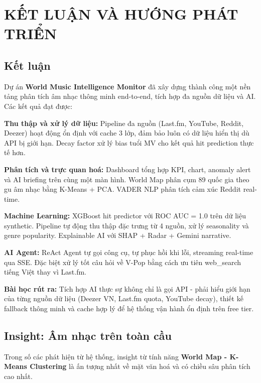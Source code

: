 \documentclass[12pt,a4paper]{report}
\begin{document}
\chapter{KẾT LUẬN VÀ HƯỚNG PHÁT TRIỂN}

\section{Kết luận}

Dự án \textbf{World Music Intelligence Monitor} đã xây dựng thành công một nền tảng phân tích âm nhạc thông minh end-to-end, tích hợp đa nguồn dữ liệu và AI. Các kết quả đạt được:

\textbf{Thu thập và xử lý dữ liệu:} Pipeline đa nguồn (Last.fm, YouTube, Reddit, Deezer) hoạt động ổn định với cache 3 lớp, đảm bảo luôn có dữ liệu hiển thị dù API bị giới hạn. Decay factor xử lý bias tuổi MV cho kết quả hit prediction thực tế hơn.

\textbf{Phân tích và trực quan hoá:} Dashboard tổng hợp KPI, chart, anomaly alert và AI briefing trên cùng một màn hình. World Map phân cụm 89 quốc gia theo gu âm nhạc bằng K-Means + PCA. VADER NLP phân tích cảm xúc Reddit real-time.

\textbf{Machine Learning:} XGBoost hit predictor với ROC AUC = 1.0 trên dữ liệu synthetic. Pipeline tự động thu thập đặc trưng từ 4 nguồn, xử lý seasonality và genre popularity. Explainable AI với SHAP + Radar + Gemini narrative.

\textbf{AI Agent:} ReAct Agent tự gọi công cụ, tự phục hồi khi lỗi, streaming real-time qua SSE. Đặc biệt xử lý tốt câu hỏi về V-Pop bằng cách ưu tiên web\_search tiếng Việt thay vì Last.fm.

\textbf{Bài học rút ra:} Tích hợp AI thực sự không chỉ là gọi API - phải hiểu giới hạn của từng nguồn dữ liệu (Deezer VN, Last.fm quota, YouTube decay), thiết kế fallback thông minh và cache hợp lý để hệ thống vận hành ổn định trên free tier.

\section{Insight: Âm nhạc trên toàn cầu}

Trong số các phát hiện từ hệ thống, insight từ tính năng \textbf{World Map - K-Means Clustering} là ấn tượng nhất về mặt văn hoá và có chiều sâu phân tích cao nhất.
\end{document}
